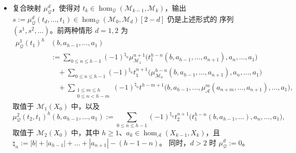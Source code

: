 \begin{Def}
\begin{itemize}
\begin{equation}
\begin{aligned}
            &\longrightarrow\mathcal M_1(X_0)[|t|-d+1],
          \end{aligned}
        \end{equation}
        对 $d\ge 1$ 与 $X_0,\dots,X_{d-1}\in\operatorname{obj}(\mathcal A)$ 给出。
        这样的 $t$ 称为\emph{预模同态}。
  \item 复合映射 $\mu^d_{\mathcal Q}$，使得对 $t_k\in\hom_{\mathcal Q}
        (\mathcal M_{k-1},\mathcal M_k)$，输出 $s:=\mu^d_{\mathcal Q}(t_d,\dots,
        t_1)\in\hom_{\mathcal Q}(\mathcal M_0,\mathcal M_d)[2-d]$ 仍是上述形式的
        序列 $(s^1,s^2,\dots)$。前两种情形 $d=1,2$ 为
        \begin{equation}\label{eq:2.26}
          \begin{aligned}
            \mu^1_{\mathcal Q}(t_1)^h&(b,a_{h-1},\dots,a_1)\\
            &:=\sum_{0\le n\le h-1}(-1)^{\natural_n}\mu^{n+1}_{\mathcal M_1}
            \bigl(t_1^{h-n}(b,a_{h-1},\dots,a_{n+1}),a_n,\dots,a_1\bigr)\\
            &\quad+\sum_{0\le n\le h-1}(-1)^{\natural_n}t_1^{n+1}\bigl(
            \mu^{h-n}_{\mathcal M_0}(b,a_{h-1},\dots,a_{n+1}),a_n,\dots,a_1\bigr)\\
            &\quad+\sum_{\substack{1\le m\le h\\ 0\le n<h-m}}(-1)^{\natural_n}
            t^{h-m+1}\bigl(b,a_{h-1},\dots,\mu^m_{\mathcal A}(a_{n+m},\dots,
            a_{n+1}),\dots,a_1\bigr),
          \end{aligned}
        \end{equation}
        取值于 $\mathcal M_1(X_0)$ 中，以及
        \begin{equation}\label{eq:2.27}
          \mu^2_{\mathcal Q}(t_2,t_1)^h(b,a_{h-1},\dots,a_1):=
          \sum_{0\le n\le h-1}(-1)^{\natural_n}t_2^{n+1}\bigl(
          t_1^{h-n}(b,a_{h-1},\dots),a_n,\dots,a_1\bigr),
        \end{equation}
        取值于 $\mathcal M_2(X_0)$ 中，其中 $h\ge 1$、$a_k\in\hom_{\mathcal A}
        (X_{k-1},X_k)$，且 $\natural_n:=|b|+|a_{h-1}|+\dots+|a_{n+1}|-(h-1-n)$。
        同时，$d>2$ 时 $\mu^d_{\mathcal Q}:=0$。
\end{itemize}
\end{Def}

